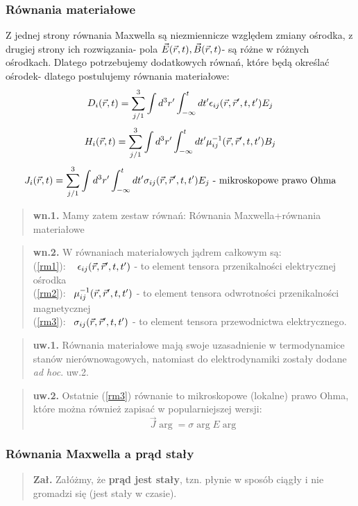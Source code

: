 \subsubsection{Równania materiałowe} 
Z jednej strony równania Maxwella są niezmiennicze względem zmiany ośrodka, z drugiej strony ich rozwiązania- pola $\vec{E}(\vec{r},t),\vec{B}(\vec{r},t)$- są różne w różnych ośrodkach. Dlatego potrzebujemy dodatkowych równań, które będą określać ośrodek- dlatego postulujemy równania materiałowe:
\begin{equation} {D}_i(\vec{r},t)=\sum_{j/1}^3\int d^3r'\int_{-\infty}^t dt' \epsilon_{ij}(\vec{r},\vec{r}',t,t') E_j \label{rm1}\end{equation}
\begin{equation} H_i (\vec{r},t) =\sum_{j/1}^3\int d^3r'\int_{-\infty}^t dt' \mu^{-1}_{ij}(\vec{r},\vec{r}',t,t') B_j \label{rm2}\end{equation}
\begin{equation} J_i (\vec{r},t) =\sum_{j/1}^3\int d^3r'\int_{-\infty}^t dt' \sigma_{ij}(\vec{r},\vec{r}',t,t') E_j \label{rm3}  \text{ - mikroskopowe prawo Ohma}\end{equation}
\begin{verse}\textbf{wn.1.} Mamy zatem zestaw równań: Równania Maxwella+równania materiałowe \end{verse}
\begin{verse}\textbf{wn.2.} W równaniach materiałowych jądrem całkowym są:\\
(\ref{rm1}): ~ $\epsilon_{ij}(\vec{r},\vec{r}',t,t')$ - to element tensora przenikalności elektrycznej ośrodka\\
(\ref{rm2}):  ~$\mu^{-1}_{ij}(\vec{r},\vec{r}',t,t')$ - to element tensora odwrotności przenikalności magnetycznej\\
(\ref{rm3}):  ~$\sigma_{ij}(\vec{r},\vec{r}',t,t')$  - to element tensora przewodnictwa elektrycznego. \end{verse}
\begin{verse} \textbf{uw.1.} Równania materiałowe mają swoje uzasadnienie w termodynamice stanów nierównowagowych, natomiast do elektrodynamiki zostały dodane \textsl{ad hoc}.
uw.2. \end{verse}
\begin{verse} \textbf{uw.2.} Ostatnie (\ref{rm3}) równanie to mikroskopowe (lokalne) prawo Ohma, które można również zapisać w popularniejszej wersji:
\begin{equation} \vec{J} \arg =\sigma\arg E\arg \end{equation} \end{verse}

\subsubsection{Równania Maxwella a prąd stały}
\begin{verse} \textbf{Zał.} Załóżmy, że \textbf{prąd jest stały}, tzn. płynie w sposób ciągły i nie gromadzi się (jest stały w czasie). \end{verse}

